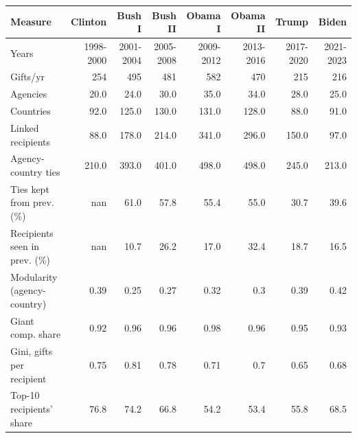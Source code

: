 \begin{tabular}{lrrrrrrr}
\toprule
Measure & Clinton & Bush I & Bush II & Obama I & Obama II & Trump & Biden \\
\midrule
Years & 1998-2000 & 2001-2004 & 2005-2008 & 2009-2012 & 2013-2016 & 2017-2020 & 2021-2023 \\
Gifts/yr & 254 & 495 & 481 & 582 & 470 & 215 & 216 \\
Agencies & 20.0 & 24.0 & 30.0 & 35.0 & 34.0 & 28.0 & 25.0 \\
Countries & 92.0 & 125.0 & 130.0 & 131.0 & 128.0 & 88.0 & 91.0 \\
Linked recipients & 88.0 & 178.0 & 214.0 & 341.0 & 296.0 & 150.0 & 97.0 \\
Agency-country ties & 210.0 & 393.0 & 401.0 & 498.0 & 498.0 & 245.0 & 213.0 \\
Ties kept from prev. (\%) & nan & 61.0 & 57.8 & 55.4 & 55.0 & 30.7 & 39.6 \\
Recipients seen in prev. (\%) & nan & 10.7 & 26.2 & 17.0 & 32.4 & 18.7 & 16.5 \\
Modularity (agency-country) & 0.39 & 0.25 & 0.27 & 0.32 & 0.3 & 0.39 & 0.42 \\
Giant comp. share & 0.92 & 0.96 & 0.96 & 0.98 & 0.96 & 0.95 & 0.93 \\
Gini, gifts per recipient & 0.75 & 0.81 & 0.78 & 0.71 & 0.7 & 0.65 & 0.68 \\
Top-10 recipients' share & 76.8 & 74.2 & 66.8 & 54.2 & 53.4 & 55.8 & 68.5 \\
\bottomrule
\end{tabular}
\par{}
